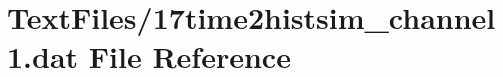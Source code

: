 \hypertarget{17time2histsim__channel1_8dat}{}\section{Text\+Files/17time2histsim\+\_\+channel1.dat File Reference}
\label{17time2histsim__channel1_8dat}
